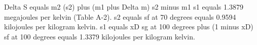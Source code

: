 Delta S equals m2 (s2) plus (m1 plus Delta m) s2 minus m1 s1 equals 1.3879 megajoules per kelvin (Table A-2).  
s2 equals sf at 70 degrees equals 0.9594 kilojoules per kilogram kelvin.  
s1 equals xD sg at 100 degrees plus (1 minus xD) sf at 100 degrees equals 1.3379 kilojoules per kilogram kelvin.